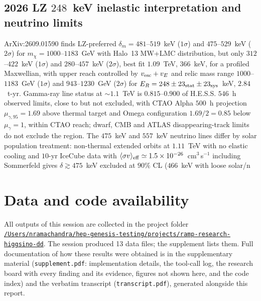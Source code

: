 \documentclass[11pt,a4paper]{article}
\begin{document}
\subsection{2026 LZ $248$~keV inelastic interpretation and neutrino limits}
ArXiv:2609.01590 finds LZ-preferred $\delta_{m}=481$--$519$~keV ($1\sigma$) and $475$--$529$~keV ($2\sigma$) for $m_{\chi}=1000$--$1183$~GeV with Halo~13 MW+LMC distribution, but only $312$--$422$~keV ($1\sigma$) and $280$--$457$~keV ($2\sigma$), best fit $1.09$~TeV, $366$~keV, for a profiled Maxwellian, with upper reach controlled by $v_{\rm esc}+v_{E}$ and relic mass range $1000$--$1183$~GeV ($1\sigma$) and $943$--$1230$~GeV ($2\sigma$) for $E_{R}=248\pm23_{\rm stat}\pm23_{\rm sys}$~keV, $2.84$~t-yr. Gamma-ray line status at $\sim1.1$~TeV is $0.815$--$0.900$ of H.E.S.S. $546$~h observed limits, close to but not excluded, with CTAO Alpha $500$~h projection $\mu_{\gamma,95}=1.69$ above thermal target and Omega configuration $1.69/2=0.85$ below $\mu_{\gamma}=1$, within CTAO reach; dwarf, CMB and ATLAS disappearing-track limits do not exclude the region. The $475$~keV and $557$~keV neutrino lines differ by solar population treatment: non-thermal extended orbits at $1.11$~TeV with no elastic cooling and $10$-yr IceCube data with $\langle\sigma v\rangle_{\rm eff}\simeq1.5\times10^{-26}$~cm$^{3}$\,s$^{-1}$ including Sommerfeld gives $\delta\gtrsim475$~keV excluded at $90\%$ CL ($466$~keV with loose solar/n

\section*{Data and code availability}
All outputs of this session are collected in the project folder \href{file:///Users/nramachandra/hep-genesis-testing/projects/ramp-research-higgsino-dd}{\texttt{/\allowbreak{}Users/\allowbreak{}nramachandra/\allowbreak{}hep-genesis-testing/\allowbreak{}projects/\allowbreak{}ramp-research-higgsino-dd}}.
The session produced 13 data files; the supplement lists them.
Full documentation of how these results were obtained is in the supplementary material (\texttt{supplement.pdf}: implementation details, the tool-call log, the research board with every finding and its evidence, figures not shown here, and the code index) and the verbatim transcript (\texttt{transcript.pdf}), generated alongside this report.
\end{document}
